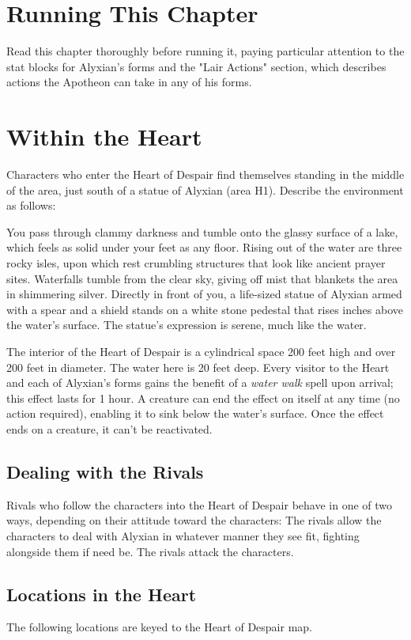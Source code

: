\documentclass[10pt,a4,twoside,twocolumn,openany,nodeprecatedcode]{dndbook}
\begin{document}
\section{Running This Chapter}
Read this chapter thoroughly before running it, paying particular attention to the stat blocks for Alyxian's forms and the "Lair Actions" section, which describes actions the Apotheon can take in any of his forms.
\section{Within the Heart}
Characters who enter the Heart of Despair find themselves standing in the middle of the area, just south of a statue of Alyxian (area H1). Describe the environment as follows:
\begin{DndReadAloud}{}
You pass through clammy darkness and tumble onto the glassy surface of a lake, which feels as solid under your feet as any floor. Rising out of the water are three rocky isles, upon which rest crumbling structures that look like ancient prayer sites.
Waterfalls tumble from the clear sky, giving off mist that blankets the area in shimmering silver. Directly in front of you, a life-sized statue of Alyxian armed with a spear and a shield stands on a white stone pedestal that rises inches above the water's surface. The statue's expression is serene, much like the water.
\end{DndReadAloud}

The interior of the Heart of Despair is a cylindrical space 200 feet high and over 200 feet in diameter. The water here is 20 feet deep.
Every visitor to the Heart and each of Alyxian's forms gains the benefit of a \textit{water walk} spell upon arrival; this effect lasts for 1 hour. A creature can end the effect on itself at any time (no action required), enabling it to sink below the water's surface. Once the effect ends on a creature, it can't be reactivated.
\subsection{Dealing with the Rivals}
Rivals who follow the characters into the Heart of Despair behave in one of two ways, depending on their attitude toward the characters:
{{The rivals allow the characters to deal with Alyxian in whatever manner they see fit, fighting alongside them if need be.}}
{{The rivals attack the characters.}}
\subsection{Locations in the Heart}
The following locations are keyed to the Heart of Despair map.
\end{document}
